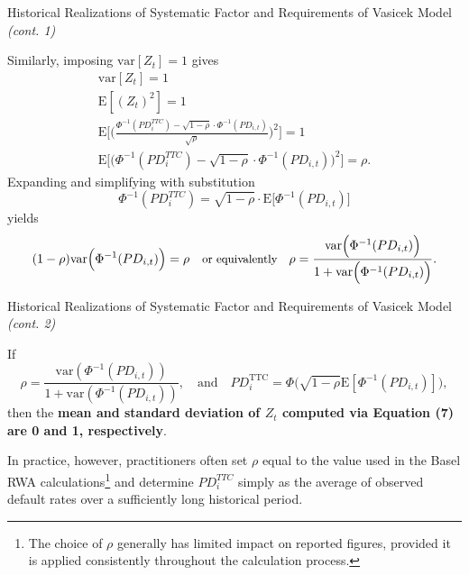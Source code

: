 \documentclass{beamer}
\begin{document}
\begin{frame}{Historical Realizations of Systematic Factor and Requirements of Vasicek Model \textit{(cont. 1)}}
\justifying
\small

Similarly, imposing $\mathrm{var}[Z_t] = 1$ gives
{\tiny
\begin{equation*}
\begin{aligned}
\mathrm{var}[Z_t] = 1 \\
\mathrm{E}[(Z_t)^2] = 1 \\
\mathrm{E} \Bigg[\Bigg(\frac{\Phi^{-1}(PD_i^{TTC}) - \sqrt{1 - \rho} \cdot \Phi^{-1}(PD_{i,t})}{\sqrt{\rho}}\Bigg)^2\Bigg] = 1 \\
\mathrm{E} \Bigg[\Bigg(\Phi^{-1}(PD_i^{TTC}) - \sqrt{1 - \rho} \cdot \Phi^{-1}(PD_{i,t})\Bigg)^2\Bigg] = \rho.
\end{aligned}
\end{equation*}
}
Expanding and simplifying with substitution
{\tiny
\begin{equation*}
\Phi^{-1}(PD_i^{TTC}) = \sqrt{1 - \rho} \cdot \mathrm{E} \Big[\Phi^{-1}(PD_{i, t}) \Big]
\end{equation*}
}
yields
{\tiny
\begin{equation*}
(1 - \rho)  \mathrm{var}\Big( \Phi^{-1}(PD_{i, t}) \Big) = \rho
\quad \small{\text{or equivalently}} \quad
\rho = \frac{\mathrm{var} \Big( \Phi^{-1}(PD_{i, t}) \Big)}{1 + \mathrm{var} \Big(\Phi^{-1}(PD_{i, t}) \Big)}.
\end{equation*}
}

\end{frame}

\begin{frame}{Historical Realizations of Systematic Factor and Requirements of Vasicek Model \textit{(cont. 2)}}
\justifying
\small

If
\begin{equation}
\rho = \frac{\mathrm{var}(\Phi^{-1}(PD_{i,t}))}{1 + \mathrm{var}(\Phi^{-1}(PD_{i,t}))}, 
\quad \text{and} \quad 
PD_i^{\mathrm{TTC}} = \Phi \Big( \sqrt{1 - \rho} \mathrm{E}[\Phi^{-1}(PD_{i,t})] \Big),
\end{equation}
then the \textbf{mean and standard deviation of $Z_t$ computed via Equation (7) are 0 and 1, respectively}.

\medskip

In practice, however, practitioners often set $\rho$ equal to the value used in the Basel RWA calculations\footnote{\tiny{The choice of $\rho$ generally has limited impact on reported figures, provided it is applied consistently throughout the calculation process.}} and determine $PD_i^{TTC}$ simply as the average of observed default rates over a sufficiently long historical period.

\end{frame}
\end{document}
